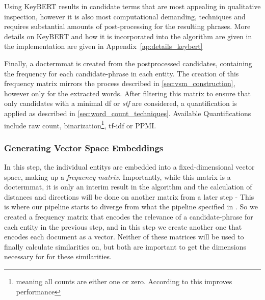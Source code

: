 Using KeyBERT results in candidate terms that are most appealing in qualitative inspection, however it is also most computational demanding, techniques and requires substantial amounts of post-processing for the resulting phrases. More details on KeyBERT and how it is incorporated into the algorithm are given in the implementation are given in Appendix~\ref{ap:details_keybert}


Finally, a \gls{doctermmat} is created from the postprocessed candidates, containing the frequency for each candidate-phrase in each entity. The creation of this frequency matrix mirrors the process described in \autoref{sec:vsm_construction}, however only for the extracted words. After filtering this matrix to ensure that only candidates with a minimal \gls{df} or \textit{stf} are considered, a quantification is applied as described in \autoref{sec:word_count_techniques}. Available Quantifications include raw count, binarization\footnote{meaning all counts are either one or zero. According to \cite{Alshaikh2020} this improves performance }, tf-idf or PPMI.

\cite{Derrac2015} 



\subsubsection{Generating Vector Space Embeddings}
\label{sec:generate_vectorspaces}


In this step, the individual \glspl{entity} are embedded into a fixed-dimensional vector space, making up a \emph{frequency matrix}. Importantly, while this matrix is a \gls{doctermmat}, it is only an interim result in the algorithm and the calculation of distances and directions will be done on another matrix from a later step - This is where our pipeline starts to diverge from what the pipeline specified in . So we created a frequency matrix that encodes the relevance of a candidate-phrase for each entity in the previous step, and in this step we create another one that encodes each document as a vector. Neither of these matrices will be used to finally calculate similarities on, but both are important to get the dimensions necessary for for these similarities.

